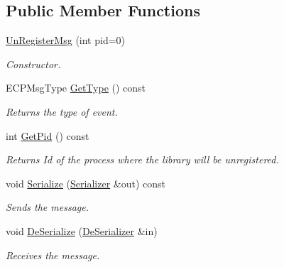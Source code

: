 \subsection*{Public Member Functions}
\begin{DoxyCompactItemize}
\item 
\hypertarget{class_common_1_1_un_register_msg_a4bfa0c03448b1d4013a50f1f9757a05f}{\hyperlink{class_common_1_1_un_register_msg_a4bfa0c03448b1d4013a50f1f9757a05f}{Un\-Register\-Msg} (int pid=0)}\label{class_common_1_1_un_register_msg_a4bfa0c03448b1d4013a50f1f9757a05f}

\begin{DoxyCompactList}\small\item\em Constructor. \end{DoxyCompactList}\item 
\hypertarget{class_common_1_1_un_register_msg_afd0a367855737be22c66ed95364248ea}{E\-C\-P\-Msg\-Type \hyperlink{class_common_1_1_un_register_msg_afd0a367855737be22c66ed95364248ea}{Get\-Type} () const }\label{class_common_1_1_un_register_msg_afd0a367855737be22c66ed95364248ea}

\begin{DoxyCompactList}\small\item\em Returns the type of event. \end{DoxyCompactList}\item 
\hypertarget{class_common_1_1_un_register_msg_af46f9213371f50f46f03a282f4044b82}{int \hyperlink{class_common_1_1_un_register_msg_af46f9213371f50f46f03a282f4044b82}{Get\-Pid} () const }\label{class_common_1_1_un_register_msg_af46f9213371f50f46f03a282f4044b82}

\begin{DoxyCompactList}\small\item\em Returns Id of the process where the library will be unregistered. \end{DoxyCompactList}\item 
\hypertarget{class_common_1_1_un_register_msg_a26e2e66038c107f9e20bf4eadfd804c8}{void \hyperlink{class_common_1_1_un_register_msg_a26e2e66038c107f9e20bf4eadfd804c8}{Serialize} (\hyperlink{class_common_1_1_serializer}{Serializer} \&out) const }\label{class_common_1_1_un_register_msg_a26e2e66038c107f9e20bf4eadfd804c8}

\begin{DoxyCompactList}\small\item\em Sends the message. \end{DoxyCompactList}\item 
\hypertarget{class_common_1_1_un_register_msg_a6bd8f2c6b8cf4329c262ce048aab5bd3}{void \hyperlink{class_common_1_1_un_register_msg_a6bd8f2c6b8cf4329c262ce048aab5bd3}{De\-Serialize} (\hyperlink{class_common_1_1_de_serializer}{De\-Serializer} \&in)}\label{class_common_1_1_un_register_msg_a6bd8f2c6b8cf4329c262ce048aab5bd3}

\begin{DoxyCompactList}\small\item\em Receives the message. \end{DoxyCompactList}\end{DoxyCompactItemize}
